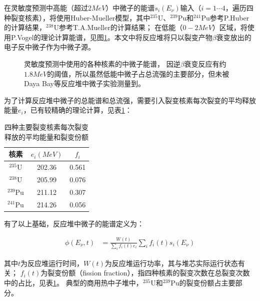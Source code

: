 在灵敏度预测中高能（超过2$\si{MeV}$）中微子的能谱$s_i(E_\nu)$输入（$i=1\cdots4$，遍历四种裂变核素），将使用Huber-Mueller模型，其中${}^{235}\mathrm{U}$、${}^{239}\mathrm{Pu}$和${}^{241}\mathrm{Pu}$参考P.Huber的计算结果\cite{huber_determination_2011}，${}^{238}\mathrm{U}$参考T.A.Mueller的计算结果\cite{mueller_improved_2011}；
在低能（$0-2\si{MeV}$）区域，将使用P.Vogel的理论计算能谱\cite{p_vogel_neutrino_1989}，见图\ref{fig:neutrino_energy_spectrum}。本文中将反应堆将只以裂变产物$\beta$衰变放出的电子反中微子作为中微子源。

\begin{figure}
    \centering
    
    \caption{\label{fig:neutrino_energy_spectrum} 灵敏度预测中使用的各种核素的中微子能谱，
    因逆$\beta$衰变反应有约$1.8\si{MeV}$的阈值，所以虽然低能中微子占总流强的主要部分，但未被Daya Bay等反应堆中微子实验测量到\cite{an_improved_2017}。}
\end{figure}

为了计算反应堆中微子的总能谱和总流强，需要引入裂变核素每次裂变的平均释放能量$e_i$，已有较精确的理论计算\cite{ma_improved_2013}，见表\ref{tab:per_fission}：

\begin{table}
  \centering
  \caption{四种主要裂变核素每次裂变释放的平均能量和裂变份额}
  \begin{tabular}{c|c|c}
    \toprule
    核素 & $e_i(\si{MeV})$ & $f_i$ \\
    \midrule
    ${}^{235}\mathrm{U}$ & 202.36 & 0.561 \\
    ${}^{238}\mathrm{U}$ & 205.99 & 0.076 \\
    ${}^{239}\mathrm{Pu}$ & 211.12 & 0.307 \\
    ${}^{241}\mathrm{Pu}$ & 214.26 & 0.056 \\
    \bottomrule
  \end{tabular}
  \label{tab:per_fission}
\end{table}

有了以上基础，反应堆中微子的能谱定义为：

\begin{align}
    \label{eq:sum_spectrum}
    \phi\left(E_\nu,t\right) &= \frac{W(t)}{\sum_i f_i(t)e_i}\sum_i f_i(t)s_i(E_\nu)
\end{align}

其中$t$为反应堆运行时间，$W(t)$为反应堆运行功率，其与堆芯实际运行状态有关\cite{juno_collaboration_tao_2020}；
$f_i(t)$为裂变份额（fission fraction），指四种核素的裂变次数在总裂变次数中的占比，见表\ref{tab:per_fission}。
典型的商用热中子堆中，${}^{235}\mathrm{U}$和${}^{239}\mathrm{Pu}$的裂变份额占主要部分。

